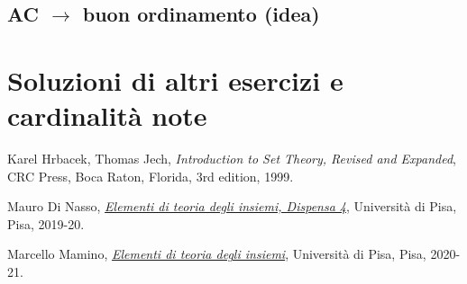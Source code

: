 \documentclass[11pt]{scrartcl}
\begin{document}
\subsection{\texorpdfstring{AC $\rightarrow$ buon ordinamento (idea)}{AC implica buon ordinamento (idea)}}

\pagebreak
\appendix
\section{Soluzioni di altri esercizi e cardinalità note}
\pagebreak
\begin{thebibliography}{9}
	Karel Hrbacek, Thomas Jech,
	\textit{Introduction to Set Theory, Revised and Expanded},
	CRC Press, Boca Raton, Florida,
	3rd edition,
	1999.

	Mauro Di Nasso,
	\href{https://people.dm.unipi.it/dinasso/ETI/dispensa-04ss.pdf}{\textit{Elementi di teoria degli insiemi, Dispensa 4}},
	Università di Pisa, Pisa,
	2019-20.


	Marcello Mamino,
	\href{https://ciovil.li/eti20/}{\textit{Elementi di teoria degli insiemi}},
	Università di Pisa, Pisa,
	2020-21.
\end{thebibliography}
\end{document}

